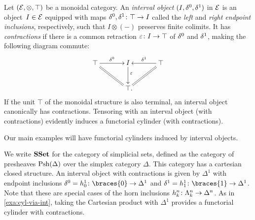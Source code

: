 \documentclass[reqno,10pt,a4paper,oneside,draft]{amsart}
\begin{document}
\begin{example} \label{exa:cyl-via-int}
Let $(\mathcal{E}, \otimes, \top)$ be a monoidal category.
An \emph{interval object} $(I, \delta^0, \delta^1)$ in $\mathcal{E}$ is an object~$I \in \mathcal{E}$ equipped with maps $\delta^0, \delta^1 \colon \top \to I$ called the \emph{left} and \emph{right endpoint inclusions}, respectively, such that $I \otimes (-)$ preserves finite colimits.
It has \emph{contractions} if there is a common retraction $\varepsilon \colon I \to \top$ of $\delta^0$ and $\delta^1$, making the following diagram commute:
\[
\xymatrix@C+1em{
  \top
  \ar[r]^-{\lcyl}
  \ar@{=}[dr]
&
  \interval
  \ar[d]^(0.4){\ccyl}
&
  \top
  \ar[l]_-{\rcyl}
  \ar@{=}[dl]
\\&
  \top
\rlap{.}}
\]
If the unit $\top$ of the monoidal structure is also terminal, an interval object canonically has contractions.
Tensoring with an interval object (with contractions) evidently induces a functorial cylinder (with contractions).
\end{example}

Our main examples will have functorial cylinders induced by interval objects.







\begin{example} \label{exa:cyl-in-sset}

We write $\mathbf{SSet}$ for the category of simplicial sets, defined as the category of presheaves $\mathrm{Psh}(\Delta)$ over the simplex category $\Delta$. This category has a cartesian closed structure. An interval object with contractions is given by $\Delta^1$ with endpoint inclusions $\lcyl = h_0^1 \co \braces{0} \to \Delta^1$ and $\rcyl = h_1^1 \co \braces{1} \to \Delta^1$.
Note that these are special cases of the horn inclusions $h_k^n \colon \Lambda_k^n \to \Delta^n$.
As in \cref{exa:cyl-via-int}, taking the Cartesian product with $\Delta^1$ provides a functorial cylinder with contractions.
\end{example}
\end{document}
